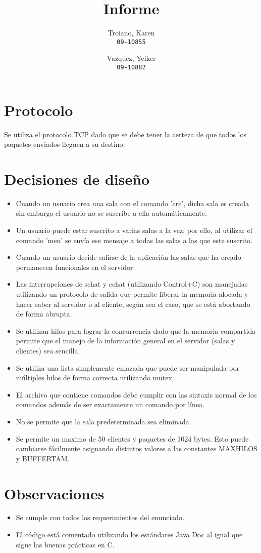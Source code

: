 \documentclass[a4paper]{article}
\title{Informe}
\author{
  Troiano, Karen\\
  \texttt{09-10855}
  \and
  Vazquez, Yeiker\\
  \texttt{09-10882}
}
\begin{document}
\maketitle

\section{Protocolo}

Se utiliza el protocolo TCP dado que se debe tener la certeza de que todos los paquetes enviados lleguen a su destino.

\section{Decisiones de diseño}
\begin{itemize}
\item Cuando un usuario crea una sala con el comando 'cre', dicha sala es creada sin embargo el usuario no se suscribe a ella automáticamente.
\item Un usuario puede estar suscrito a varias salas a la vez; por ello, al utilizar el comando 'men' se envía ese mensaje a todas las salas a las que este suscrito.
\item Cuando un usuario decide salirse de la aplicación las salas que ha creado permanecen funcionales en el servidor.
\item Las interrupciones de schat y cchat (utilizando Control+C) son manejadas utilizando un protocolo de salida que permite liberar la memoria alocada y hacer saber al servidor o al cliente, según sea el caso, que se está abortando de forma abrupta.
\item Se utilizan hilos para lograr la concurrencia dado que la memoria compartida permite que el manejo de la información general en el servidor (salas y clientes) sea sencilla.
\item Se utiliza una lista simplemente enlazada que puede ser manipulada por múltiples hilos de forma correcta utilizando mutex.
\item El archivo que contiene comandos debe cumplir con las sintaxis normal de los comandos además de ser exactamente un comando por línea.
\item No se permite que la sala predeterminada sea eliminada.
\item Se permite un maximo de 50 clientes y paquetes de 1024 bytes. Esto puede cambiarse fácilmente asignando distintos valores a las constantes MAXHILOS y BUFFERTAM.
\end{itemize}

\section{Observaciones}
\begin{itemize}
\item Se cumple con todos los requerimientos del enunciado.
\item El código está comentado utilizando los estándares Java Doc al igual que sigue las buenas prácticas en C.
\end{itemize}
\end{document}
